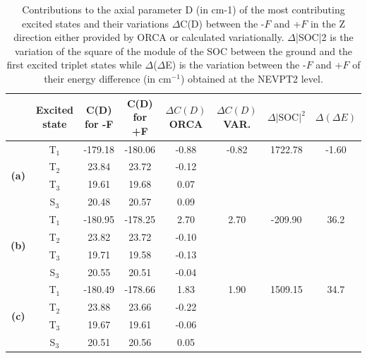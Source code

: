 \documentclass[10pt]{report}
\numberwithin{equation}{section}
\begin{document}
\begin{table}[h]
    \centering
    \begin{tabular}{c | c | c  c | c c |c |c}
    \hline
    \textbf{} & \textbf{Excited state} & \textbf{C(D) for -F} & \textbf{C(D) for +F} & $\Delta C(D)$ ORCA & $\Delta C(D)$ VAR. & $\Delta|\text{SOC}|^2$ & $\Delta(\Delta E)$ \\
    \hline
    \multirow{4}{*}{\textbf{(a)}} 
     & T$_1$ & -179.18 & -180.06 & -0.88 & -0.82 & 1722.78 & -1.60 \\
     & T$_2$ &  23.84 &  23.72 & -0.12 &        &          &       \\
     & T$_3$ &  19.61 &  19.68 &  0.07 &        &          &       \\
     & S$_3$ &  20.48 &  20.57 &  0.09 &        &          &       \\
    \hline
    \hline
    \multirow{4}{*}{\textbf{(b)}} 
     & T$_1$ & -180.95 & -178.25 &  2.70 &  2.70 & -209.90 & 36.2  \\
     & T$_2$ &  23.82 &  23.72 & -0.10 &        &         &       \\
     & T$_3$ &  19.71 &  19.58 & -0.13 &        &         &       \\
     & S$_3$ &  20.55 &  20.51 & -0.04 &        &         &       \\
    \hline
    \hline
    \multirow{4}{*}{\textbf{(c)}} 
     & T$_1$ & -180.49 & -178.66 &  1.83 &  1.90 & 1509.15 & 34.7  \\
     & T$_2$ &  23.88 &  23.66 & -0.22 &        &         &       \\
     & T$_3$ &  19.67 &  19.61 & -0.06 &        &         &       \\
     & S$_3$ &  20.51 &  20.56 &  0.05 &        &         &       \\
    \hline
    \end{tabular}
    \caption{Contributions to the axial parameter D (in cm-1) of the most contributing excited states and their variations $\Delta$C(D) between the -$F$ and +$F$ in the Z direction either provided by ORCA or calculated variationally. $\Delta$|SOC|2 is the variation of the square of the module of the SOC between the ground and the first excited triplet states while $\Delta$($\Delta$E) is the variation between the -$F$ and +$F$ of their energy difference (in cm$^{-1}$) obtained at the NEVPT2 level.}
    \label{tab:Contribution_Z}
\end{table}
\end{document}
